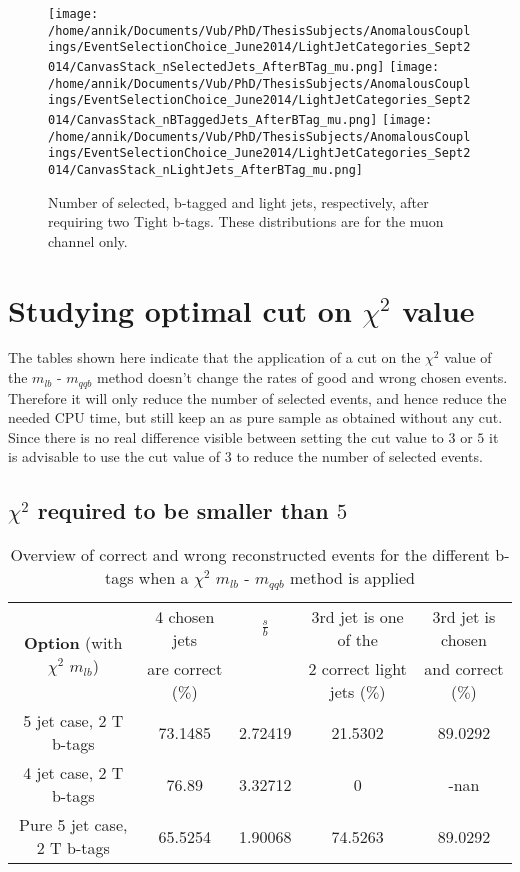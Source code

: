 \documentclass[a4paper,12pt]{report}
\begin{document}
\begin{figure}[!h]
\texttt{[image: /home/annik/Documents/Vub/PhD/ThesisSubjects/AnomalousCouplings/EventSelectionChoice\_June2014/LightJetCategories\_Sept2014/CanvasStack\_nSelectedJets\_AfterBTag\_mu.png]}
\texttt{[image: /home/annik/Documents/Vub/PhD/ThesisSubjects/AnomalousCouplings/EventSelectionChoice\_June2014/LightJetCategories\_Sept2014/CanvasStack\_nBTaggedJets\_AfterBTag\_mu.png]}
\texttt{[image: /home/annik/Documents/Vub/PhD/ThesisSubjects/AnomalousCouplings/EventSelectionChoice\_June2014/LightJetCategories\_Sept2014/CanvasStack\_nLightJets\_AfterBTag\_mu.png]}
\caption{Number of selected, b-tagged and light jets, respectively, after requiring two Tight b-tags. These distributions are for the muon channel only.}
\end{figure}

 
\section{Studying optimal cut on $\chi^{2}$ value}
The tables shown here indicate that the application of a cut on the $\chi^{2}$ value of the $m_{lb}$ - $m_{qqb}$ method doesn't change the rates of good and wrong chosen events. Therefore it will only reduce the number of selected events, and hence reduce the needed CPU time, but still keep an as pure sample as obtained without any cut.\\
Since there is no real difference visible between setting the cut value to $3$ or $5$ it is advisable to use the cut value of $3$ to reduce the number of selected events.
 
\subsection{$\chi^{2}$ required to be smaller than $5$}
  \begin{table}[!h] 
 \begin{tabular}{c|c|c|c|c} 
\multirow{2}{*}{\textbf{Option} (with $\chi^{2}$ $m_{lb}$)} & 4 chosen jets & $\frac{s}{b}$ & 3rd jet is one of the & 3rd jet is chosen \\ & are correct ($\%$)    & 	             & 2 correct light jets ($\%$) &  and correct ($\%$)	  \\ \hline 
 5 jet case,      2 T b-tags              & 73.1485 & 2.72419 & 21.5302 & 89.0292 \\ 
 4 jet case,      2 T b-tags              & 76.89 & 3.32712 & 0 & -nan \\ 
 Pure 5 jet case, 2 T b-tags              & 65.5254 & 1.90068 & 74.5263 & 89.0292 \\ 
 \end{tabular} 
 \caption{Overview of correct and wrong reconstructed events for the different b-tags when a $\chi^{2}$ $m_{lb}$ - $m_{qqb}$ method is applied} 
 \end{table} 
 
\end{document}

